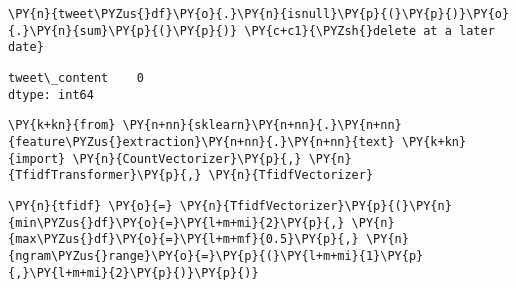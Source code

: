     \begin{tcolorbox}[breakable, size=fbox, boxrule=1pt, pad at break*=1mm,colback=cellbackground, colframe=cellborder]
\begin{Verbatim}[commandchars=\\\{\}]
\PY{n}{tweet\PYZus{}df}\PY{o}{.}\PY{n}{isnull}\PY{p}{(}\PY{p}{)}\PY{o}{.}\PY{n}{sum}\PY{p}{(}\PY{p}{)} \PY{c+c1}{\PYZsh{}delete at a later date}
\end{Verbatim}
\end{tcolorbox}

            \begin{tcolorbox}[breakable, size=fbox, boxrule=.5pt, pad at break*=1mm, opacityfill=0]
\begin{Verbatim}[commandchars=\\\{\}]
tweet\_content    0
dtype: int64
\end{Verbatim}
\end{tcolorbox}
        
    \begin{tcolorbox}[breakable, size=fbox, boxrule=1pt, pad at break*=1mm,colback=cellbackground, colframe=cellborder]
\begin{Verbatim}[commandchars=\\\{\}]
\PY{k+kn}{from} \PY{n+nn}{sklearn}\PY{n+nn}{.}\PY{n+nn}{feature\PYZus{}extraction}\PY{n+nn}{.}\PY{n+nn}{text} \PY{k+kn}{import} \PY{n}{CountVectorizer}\PY{p}{,} \PY{n}{TfidfTransformer}\PY{p}{,} \PY{n}{TfidfVectorizer}
\end{Verbatim}
\end{tcolorbox}

    \begin{tcolorbox}[breakable, size=fbox, boxrule=1pt, pad at break*=1mm,colback=cellbackground, colframe=cellborder]
\begin{Verbatim}[commandchars=\\\{\}]
\PY{n}{tfidf} \PY{o}{=} \PY{n}{TfidfVectorizer}\PY{p}{(}\PY{n}{min\PYZus{}df}\PY{o}{=}\PY{l+m+mi}{2}\PY{p}{,} \PY{n}{max\PYZus{}df}\PY{o}{=}\PY{l+m+mf}{0.5}\PY{p}{,} \PY{n}{ngram\PYZus{}range}\PY{o}{=}\PY{p}{(}\PY{l+m+mi}{1}\PY{p}{,}\PY{l+m+mi}{2}\PY{p}{)}\PY{p}{)}
\end{Verbatim}
\end{tcolorbox}

